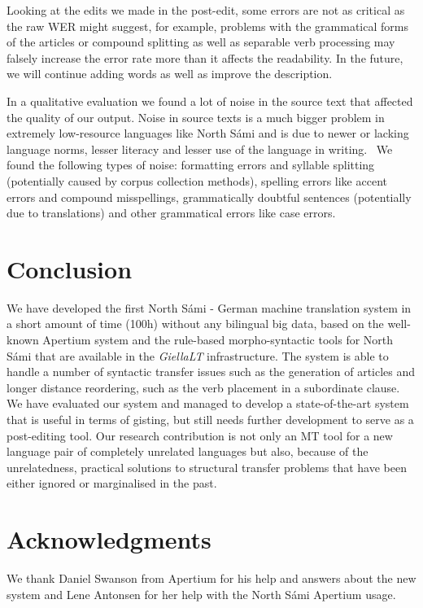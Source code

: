 \documentclass{flammie}
\begin{document}
Looking at the edits we made in the post-edit, some errors are not as critical
as the raw WER might suggest, for example, problems with the grammatical forms
of the articles or compound splitting as well as separable verb processing may
falsely increase the error rate more than it affects the readability.  In the
future, we will continue adding words as well as improve the description.

In a qualitative evaluation we found a lot of noise in the source text that
affected the quality of our output.  Noise in source texts is a much bigger
problem in extremely low-resource languages like North Sámi and is due to newer
or lacking language norms, lesser literacy and lesser use of the language in
writing.~\cite{wiechetek2022unmasking} We found the following types of noise:
formatting errors and syllable splitting (potentially caused by corpus
collection methods), spelling errors like accent errors and compound
misspellings, grammatically doubtful sentences (potentially due to translations)
and other grammatical errors like case errors.




\section{Conclusion}

We have developed the first North Sámi - German machine translation system in a
short amount of time (100h) without any bilingual big data, based on the
well-known Apertium system and the rule-based morpho-syntactic tools for North
Sámi that are available in the  \textit{GiellaLT} infrastructure.  The system is
able to handle a number of syntactic transfer issues such as the generation of
articles and longer distance reordering, such as the verb placement in a
subordinate clause.  We have evaluated our system and managed to develop a
state-of-the-art system that is useful in terms of gisting, but still needs
further development to serve as a post-editing tool.  Our research contribution
is not only an MT tool for a new language pair of completely unrelated languages
but also, because of the unrelatedness, practical solutions to structural
transfer problems that have been either ignored or marginalised in the past.

\section*{Acknowledgments}
We thank Daniel Swanson from Apertium for his help and answers about the new system and Lene Antonsen for her help with the North Sámi Apertium usage.



\end{document}
